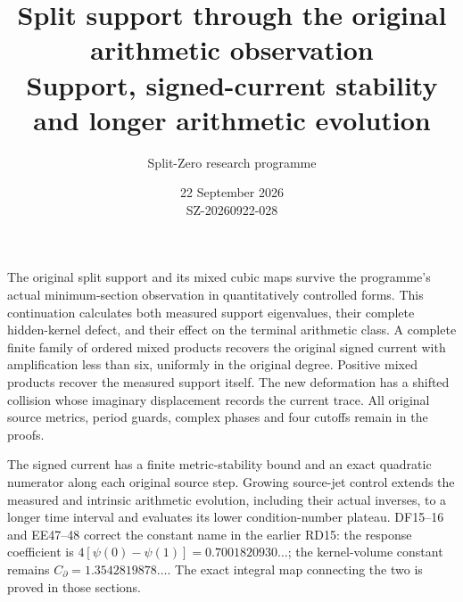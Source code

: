 \documentclass[10pt]{article}
\title{Split support through the original arithmetic observation\\Support, signed-current stability and longer arithmetic evolution}
\author{Split-Zero research programme}
\date{22 September 2026\\SZ-20260922-028}
\begin{document}
\maketitle
The original split support and its mixed cubic maps survive the programme's actual
minimum-section observation in quantitatively controlled forms. This continuation
calculates both measured support eigenvalues, their complete hidden-kernel defect,
and their effect on the terminal arithmetic class. A complete finite family of
ordered mixed products recovers the original signed current with amplification
less than six, uniformly in the original degree. Positive mixed products recover
the measured support itself. The new deformation has a shifted collision whose
imaginary displacement records the current trace. All original source metrics,
period guards, complex phases and four cutoffs remain in the proofs.

The signed current has a finite metric-stability bound and an exact quadratic
numerator along each original source step. Growing source-jet control extends
the measured and intrinsic arithmetic evolution, including their actual inverses,
to a longer time interval and evaluates its lower condition-number plateau.
DF15--16 and EE47--48 correct the constant name in the earlier RD15:
the response coefficient is $4[\psi(0)-\psi(1)]=0.7001820930\ldots$;
the kernel-volume constant remains $C_\partial=1.3542819878\ldots$.
The exact integral map connecting the two is proved in those sections.
\end{document}
